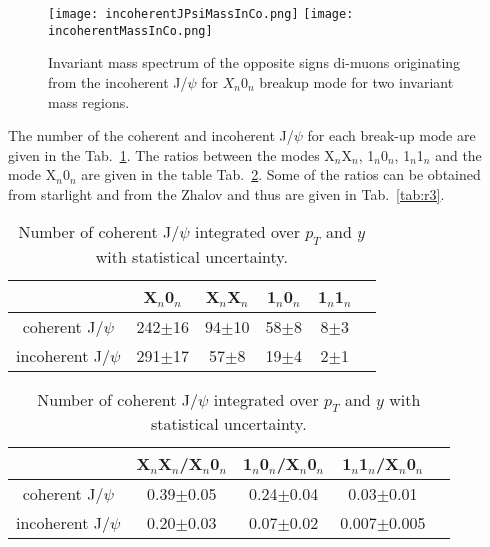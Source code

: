     \begin{figure*}[!Hhtb]
      \begin{center}
        \texttt{[image: incoherentJPsiMassInCo.png]}
        \texttt{[image: incoherentMassInCo.png]}
        \caption{
          Invariant mass spectrum of the opposite signs di-muons originating
          from the incoherent J/$\psi$  for $X_{n}0_{n}$ breakup mode for two 
          invariant mass regions.   
        }
        \label{fig:r2}  
      \end{center}
    \end{figure*}
    
    The number of the coherent and incoherent J/$\psi$ for each break-up mode are
      given in the Tab.~\ref{tab:r1}. 
    The ratios between the modes X$_{n}$X$_{n}$, 1$_{n}$0$_{n}$, 1$_{n}$1$_{n}$ and
      the mode  X$_{n}$0$_{n}$ are given in the table Tab.~\ref{tab:r2}. 
    Some of the  ratios can be obtained from  {\sc starlight} and from the Zhalov 
      and thus are given in Tab.~\ref{tab:r3}.
    
    \begin{table}[h]
    \begin{center}
    \caption{Number of coherent J/$\psi$ integrated over $p_{T}$ and $y$ with statistical uncertainty.}
    \label{tab:r1}
    \begin{tabular}{|c|c|c|c|c|c|}
    \hline
                                   &  X$_{n}$0$_{n}$& X$_{n}$X$_{n}$ & 1$_{n}$0$_{n}$ & 1$_{n}$1$_{n}$  \\ 
    \hline
    coherent J/$\psi$ &  242$\pm$16&94$\pm$10&58$\pm$8&8$\pm$3\\
    \hline
     incoherent J/$\psi$ & 291$\pm$17&57$\pm$8&19$\pm$4&2$\pm$1  \\
    \hline
    \end{tabular}
    \end{center}
    
    \end{table}
    
    \begin{table}[h]
      \begin{center}
        \caption{Number of coherent J/$\psi$ integrated over $p_{T}$ and $y$ 
          with statistical uncertainty.}
        \label{tab:r2}
        \begin{tabular}{|c|c|c|c|c|}
          \hline
          & X$_{n}$X$_{n}$/X$_{n}$0$_{n}$ & 1$_{n}$0$_{n}$/X$_{n}$0$_{n}$ & 1$_{n}$1$_{n}$/X$_{n}$0$_{n}$  \\ 
          \hline
          coherent J/$\psi$ &  0.39$\pm$0.05&0.24$\pm$0.04&0.03$\pm$0.01\\
          \hline
          incoherent J/$\psi$ &  0.20$\pm$0.03&0.07$\pm$0.02&0.007$\pm$0.005 \\
          \hline
        \end{tabular}
      \end{center}
    \end{table}

